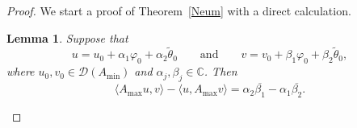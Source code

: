 \documentclass[10pt,a4paper]{amsart}
\numberwithin{equation}{section}
\newtheorem{Lemma}[Theorem]{Lemma}
\begin{document}
 \begin{proof}
 We start a proof of Theorem~\ref{Neum} with a direct calculation.

 \begin{Lemma}\label{Neum1}
 Suppose that
 \begin{equation}
u=u_{0}+ \alpha_{1} \varphi_{0}+ \alpha_{2} \tilde{\theta}_{0 }\qquad\mbox{and}\qquad v=v_{0}+ \beta_{1} \varphi_{0}+ \beta_{2} \tilde{\theta}_{0 },
 \label{eq:Ne1}
 \end{equation}
 where $u_{0}, v_{0} \in {\mathcal D}(A_{\min})$ and $\alpha_{j}, \beta_{j}\in {\mathbb C}$. Then
 \begin{equation}
\langle A_{\max} u,v\rangle -\langle u, A_{\max} v\rangle = \alpha_{2} \overline{\beta_{1}}-\alpha_{1} \overline{\beta_{2}}.
 \label{eq:Ne6}\end{equation}
 \end{Lemma}


\end{proof}
\end{document}
